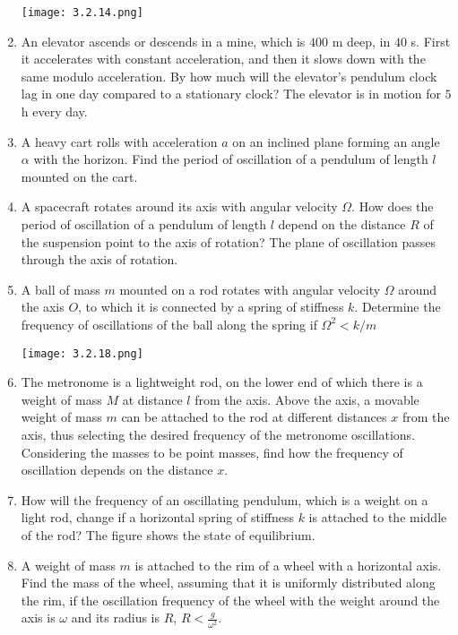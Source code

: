 \documentclass{article}
\begin{document}
\begin{enumerate}[label=3.2.\arabic*]
\begin{center}
    \texttt{[image: 3.2.14.png]}
\end{center}

\item An elevator ascends or descends in a mine, which is $400$ m deep, in $40$ s. First it accelerates with constant acceleration, and then it slows down with the same modulo acceleration. By how much will the elevator's pendulum clock lag in one day compared to a stationary clock? The elevator is in motion for $5$ h every day.


\item A heavy cart rolls with acceleration $a$ on an inclined plane forming an angle $\alpha$ with the horizon. Find the period of oscillation of a pendulum of length $l$ mounted on the cart.

\item A spacecraft rotates around its axis with angular velocity $\Omega$. How does the period of oscillation of a pendulum of length $l$ depend on the distance $R$ of the suspension point to the axis of rotation? The plane of oscillation passes through the axis of rotation.

\item A ball of mass $m$ mounted on a rod rotates with angular velocity $\Omega$ around the axis $O$, to which it is connected by a spring of stiffness $k$. Determine the frequency of oscillations of the ball along the spring if $\Omega^2 < k/m$

\begin{center}
    \texttt{[image: 3.2.18.png]}
\end{center}

\item The metronome is a lightweight rod, on the lower end of which there is a weight of mass $M$ at distance $l$ from the axis. Above the axis, a movable weight of mass $m$ can be attached to the rod at different distances $x$ from the axis, thus selecting the desired frequency of the metronome oscillations. Considering the masses to be point masses, find how the frequency of oscillation depends on the distance $x$.

\item How will the frequency of an oscillating pendulum, which is a weight on a light rod, change if a horizontal spring of stiffness $k$ is attached to the middle of the rod? The figure shows the state of equilibrium.

\item A weight of mass $m$ is attached to the rim of a wheel with a horizontal axis. Find the mass of the wheel, assuming that it is uniformly distributed along the rim, if the oscillation frequency of the wheel with the weight around the axis is $\omega$ and its radius is $R$, $R < \frac{g}{\omega^2}$.


\end{enumerate}
\end{document}
